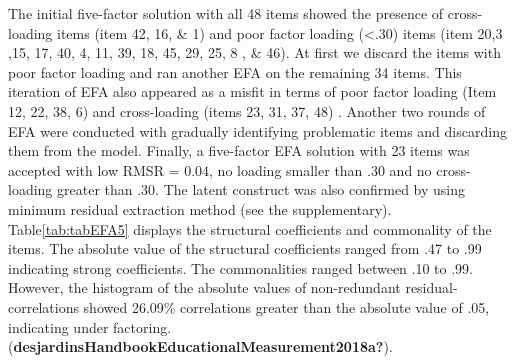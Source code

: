 \documentclass[
  english,
  man]{apa6}
\begin{document}
The initial five-factor solution with all 48 items showed the presence of cross-loading items (item 42, 16, \& 1) and poor factor loading (\textless.30) items (item 20,3 ,15, 17, 40, 4, 11, 39, 18, 45, 29, 25, 8 , \& 46). At first we discard the items with poor factor loading and ran another EFA on the remaining 34 items. This iteration of EFA also appeared as a misfit in terms of poor factor loading (Item 12, 22, 38, 6) and cross-loading (items 23, 31, 37, 48) . Another two rounds of EFA were conducted with gradually identifying problematic items and discarding them from the model. Finally, a five-factor EFA solution with 23 items was accepted with low RMSR = 0.04, no loading smaller than .30 and no cross-loading greater than .30. The latent construct was also confirmed by using minimum residual extraction method (see the supplementary). Table\ref{tab:tabEFA5} displays the structural coefficients and commonality of the items. The absolute value of the structural coefficients ranged from .47 to .99 indicating strong coefficients. The commonalities ranged between .10 to .99. However, the histogram of the absolute values of non-redundant residual-correlations showed 26.09\% correlations greater than the absolute value of .05, indicating under factoring. (\textbf{desjardinsHandbookEducationalMeasurement2018a?}).
\end{document}
